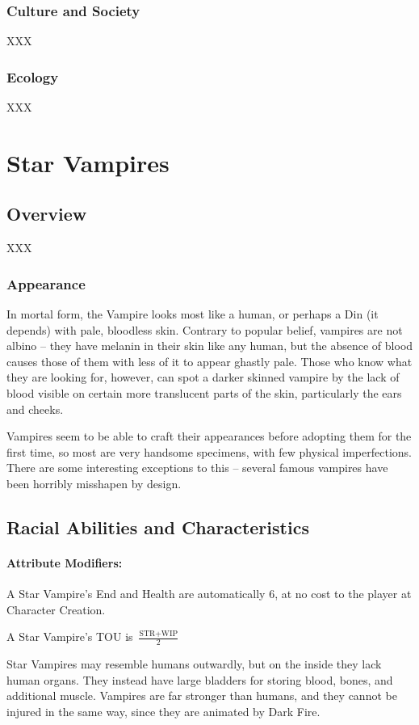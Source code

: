 \documentclass[oneside,11pt,english]{book}
\begin{document}
\subsubsection*{Culture and Society} 
XXX 
\subsubsection*{Ecology} 
XXX 
\section{Star Vampires}\label{sec:star-vampires}
\subsection*{Overview} 
XXX
\subsubsection*{Appearance}
In mortal form, the Vampire looks most like a human, or perhaps a Din (it depends) with pale, 
bloodless skin. Contrary to popular belief, vampires are not albino -- they have melanin in their 
skin like any human, but the absence of blood causes those of them with less of it to appear 
ghastly pale. Those who know what they are looking for, however, can spot a darker skinned 
vampire by the lack of blood visible on certain more translucent parts of the skin, particularly the 
ears and cheeks.

Vampires seem to be able to craft their appearances before adopting them for the first time, so 
most are very handsome specimens, with few physical imperfections. There are some 
interesting exceptions to this -- several famous vampires have been horribly misshapen by 
design.
\subsection*{Racial Abilities and Characteristics} 
\paragraph{Attribute Modifiers:} A Star Vampire’s End and Health are automatically 6, at no cost to the player at Character Creation.

A Star Vampire’s TOU is $ \frac{\text{STR}+\text{WIP}}{2} $

Star Vampires may resemble humans outwardly, but on the inside they lack human organs. They instead have large bladders for storing blood, bones, and additional muscle. Vampires are far stronger than humans, and they cannot be injured in the same way, since they are animated by Dark Fire.
\end{document}
